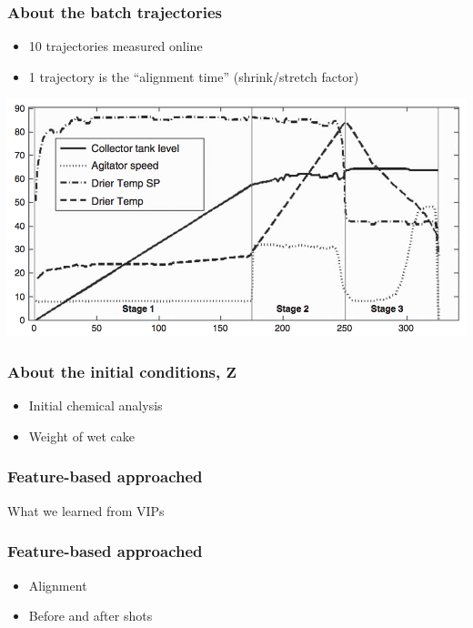 \begin{frame}\frametitle{About the batch trajectories}

\begin{itemize}
	\item	10 trajectories measured online
	
	\item	1 trajectory is the ``alignment time'' (shrink/stretch factor)
\end{itemize}
\begin{center}
	\includegraphics[width=\textwidth]{images/fmc/fmc-phases-4-trajectories.png}
\end{center}	

\end{frame}

\begin{frame}\frametitle{About the initial conditions, \( \mathbf{Z}\)}

\begin{itemize}
	\item	Initial chemical analysis
	
	\item	Weight of wet cake
\end{itemize}

\end{frame}

\begin{frame}\frametitle{Feature-based approached}

What we learned from VIPs

\end{frame}

\begin{frame}\frametitle{Feature-based approached}

	\begin{itemize}
		\item	Alignment
		\item	Before and after shots
	\end{itemize}


\end{frame}
